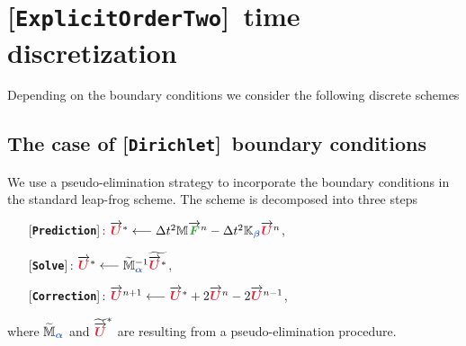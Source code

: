 \documentclass[11pt,a4paper]{article}
\newcommand{\unknown}[1]{\bm{{\color{myred}{#1}}}}
\newcommand{\param}[1]{\bm{{\color{myhyperblue}{#1}}}}
\newcommand{\data}[1]{\bm{{\color{mygreen}{#1}}}}
\newcommand{\keyword}[1]{[\texttt{\textbf{#1}}]\!\,}
\begin{document}
\section{\keyword{ExplicitOrderTwo} time discretization}
Depending on the boundary conditions we consider the following discrete schemes
\subsection{The case of \keyword{Dirichlet} boundary conditions}
We use a pseudo-elimination strategy to incorporate the boundary conditions in the standard leap-frog scheme. The scheme is decomposed into three steps
\begin{itemize}
\item[] \keyword{Prediction}: $\overrightarrow{\unknown{U}}^* \longleftarrow \Delta t^2 \mathbb{M} \overrightarrow{\data{F}}^n - \Delta t^2 \mathbb{K}_{\param{\beta}} \overrightarrow{\unknown{U}}^{n}$,
\item[] \keyword{Solve}: $ \overrightarrow{\unknown{U}}^* \longleftarrow \widetilde{\mathbb{M}}_{\param{\alpha}}^{-1} \widetilde{\overrightarrow{\unknown{U}}^*}$,
\item[] \keyword{Correction}: $\overrightarrow{\unknown{U}}^{n+1} \longleftarrow \overrightarrow{\unknown{U}}^* + 2 \overrightarrow{\unknown{U}}^n - 2 \overrightarrow{\unknown{U}}^{n-1}$,
\end{itemize}
where $\widetilde{\mathbb{M}}_{\param{\alpha}}$ and $\widetilde{\overrightarrow{\unknown{U}}}^*$ are resulting from a pseudo-elimination procedure.
\end{document}
